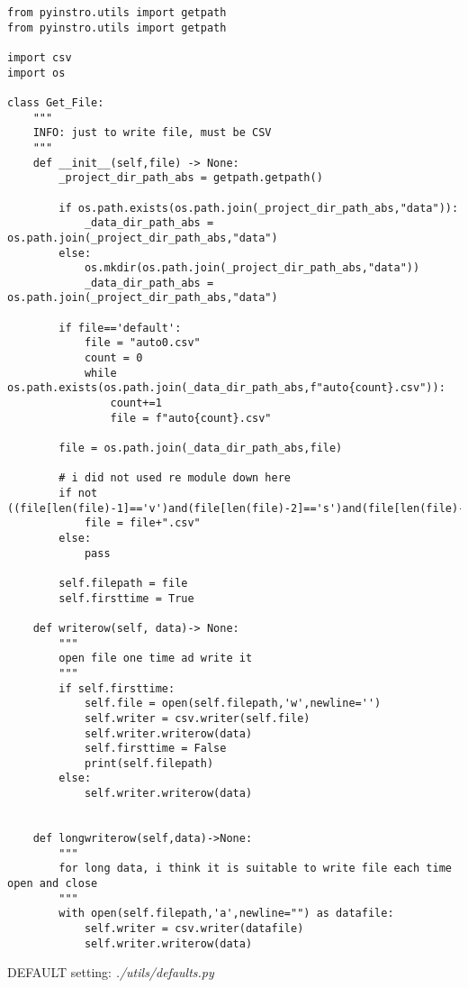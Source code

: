 \begin{verbatim}
from pyinstro.utils import getpath
from pyinstro.utils import getpath

import csv
import os

class Get_File:
    """
    INFO: just to write file, must be CSV 
    """
    def __init__(self,file) -> None:
        _project_dir_path_abs = getpath.getpath()

        if os.path.exists(os.path.join(_project_dir_path_abs,"data")):
            _data_dir_path_abs = os.path.join(_project_dir_path_abs,"data")
        else:
            os.mkdir(os.path.join(_project_dir_path_abs,"data"))
            _data_dir_path_abs = os.path.join(_project_dir_path_abs,"data")
        
        if file=='default':
            file = "auto0.csv"
            count = 0
            while os.path.exists(os.path.join(_data_dir_path_abs,f"auto{count}.csv")):
                count+=1
                file = f"auto{count}.csv"

        file = os.path.join(_data_dir_path_abs,file)
        
        # i did not used re module down here
        if not ((file[len(file)-1]=='v')and(file[len(file)-2]=='s')and(file[len(file)-3]=='c')and(file[len(file)-4]=='.')):
            file = file+".csv"
        else:
            pass
        
        self.filepath = file
        self.firsttime = True

    def writerow(self, data)-> None:
        """
        open file one time ad write it
        """
        if self.firsttime:
            self.file = open(self.filepath,'w',newline='')
            self.writer = csv.writer(self.file)
            self.writer.writerow(data)
            self.firsttime = False
            print(self.filepath)
        else:
            self.writer.writerow(data)


    def longwriterow(self,data)->None:
        """
        for long data, i think it is suitable to write file each time open and close
        """
        with open(self.filepath,'a',newline="") as datafile:
            self.writer = csv.writer(datafile)
            self.writer.writerow(data)

\end{verbatim}


DEFAULT setting: \emph{./utils/defaults.py}

